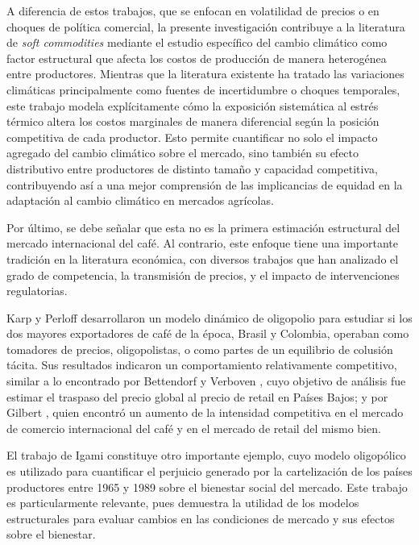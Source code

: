 A diferencia de estos trabajos, que se enfocan en volatilidad de precios o en choques de política comercial, la presente investigación contribuye a la literatura de \textit{soft commodities} mediante el estudio específico del cambio climático como factor estructural que afecta los costos de producción de manera heterogénea entre productores. Mientras que la literatura existente ha tratado las variaciones climáticas principalmente como fuentes de incertidumbre o choques temporales, este trabajo modela explícitamente cómo la exposición sistemática al estrés térmico altera los costos marginales de manera diferencial según la posición competitiva de cada productor. Esto permite cuantificar no solo el impacto agregado del cambio climático sobre el mercado, sino también su efecto distributivo entre productores de distinto tamaño y capacidad competitiva, contribuyendo así a una mejor comprensión de las implicancias de equidad en la adaptación al cambio climático en mercados agrícolas.

Por último, se debe señalar que esta no es la primera estimación estructural del mercado internacional del café. Al contrario, este enfoque tiene una importante tradición en la literatura económica, con diversos trabajos que han analizado el grado de competencia, la transmisión de precios, y el impacto de intervenciones regulatorias.

Karp y Perloff \citeyearpar{karp1993dynamic} desarrollaron un modelo dinámico de oligopolio para estudiar si los dos mayores exportadores de café de la época, Brasil y Colombia, operaban como tomadores de precios, oligopolistas, o como partes de un equilibrio de colusión tácita. Sus resultados indicaron un comportamiento relativamente competitivo, similar a lo encontrado por Bettendorf y Verboven \citeyearpar{bettendorf2000incomplete}, cuyo objetivo de análisis fue estimar el traspaso del precio global al precio de retail en Países Bajos; y por Gilbert \citeyearpar{gilbert2007}, quien encontró un aumento de la intensidad competitiva en el mercado de comercio internacional del café y en el mercado de retail del mismo bien.

El trabajo de Igami \citeyearpar{igami2015market} constituye otro importante ejemplo, cuyo modelo oligopólico es utilizado para cuantificar el perjuicio generado por la cartelización de los países productores entre 1965 y 1989 sobre el bienestar social del mercado. Este trabajo es particularmente relevante, pues demuestra la utilidad de los modelos estructurales para evaluar cambios en las condiciones de mercado y sus efectos sobre el bienestar.

